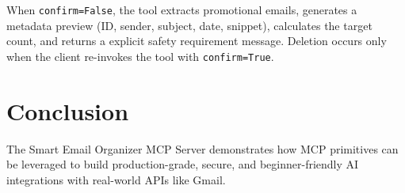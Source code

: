 \documentclass[11pt,a4paper]{article}
\begin{document}
When \texttt{confirm=False}, the tool extracts promotional emails, generates a metadata preview (ID, sender, subject, date, snippet), calculates the target count, and returns a explicit safety requirement message. Deletion occurs only when the client re-invokes the tool with \texttt{confirm=True}.

\section{Conclusion}
The Smart Email Organizer MCP Server demonstrates how MCP primitives can be leveraged to build production-grade, secure, and beginner-friendly AI integrations with real-world APIs like Gmail.
\end{document}
